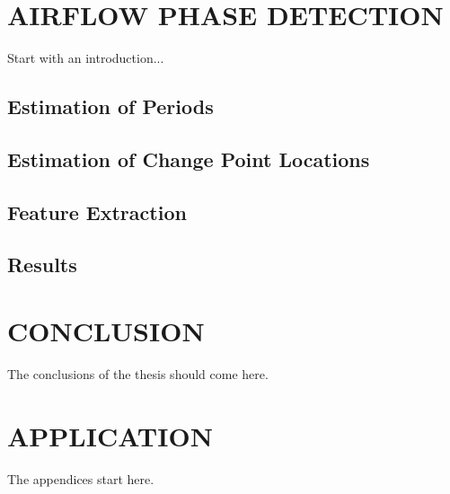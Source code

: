 \documentclass[a4paper,onesided,12pt]{report}
\begin{document}
\chapter{AIRFLOW PHASE DETECTION}
\label{chapter:introduction}
Start with an introduction...

\section{Estimation of Periods}
\section{Estimation of Change Point Locations}
\section{Feature Extraction}

\section{Results}

\chapter{CONCLUSION}
\label{chapter:conclusion}

The conclusions of the thesis should come
here.




\appendix
\chapter{APPLICATION}
The appendices start here.
\end{document}
